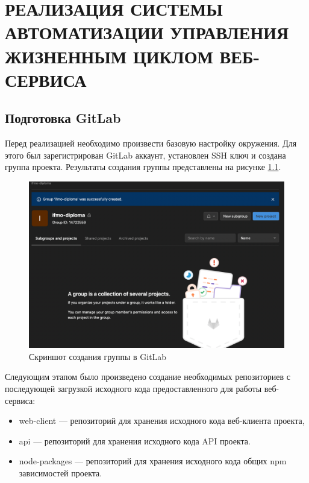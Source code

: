 \chapter{РЕАЛИЗАЦИЯ СИСТЕМЫ АВТОМАТИЗАЦИИ УПРАВЛЕНИЯ ЖИЗНЕННЫМ ЦИКЛОМ ВЕБ-СЕРВИСА}
\label{cha:impl}

\section{Подготовка GitLab}

Перед реализацией необходимо произвести базовую настройку окружения.
Для этого был зарегистрирован GitLab аккаунт, установлен SSH ключ и создана группа проекта.
Результаты создания группы представлены на рисунке \ref{fig:group-ready}.

\begin{figure}[ht]
    \centering
    \includegraphics[scale=0.4]{src/figures/group-ready}
    \caption{Скриншот создания группы в GitLab}
    \label{fig:group-ready}
\end{figure}

Следующим этапом было произведено создание необходимых репозиториев с последующей загрузкой исходного кода предоставленного для работы веб-сервиса:

\begin{itemize}
    \item web-client --- репозиторий для хранения исходного кода веб-клиента проекта,
    \item api --- репозиторий для хранения исходного кода API проекта.
    \item node-packages --- репозиторий для хранения исходного кода общих npm зависимостей проекта.
\end{itemize}

